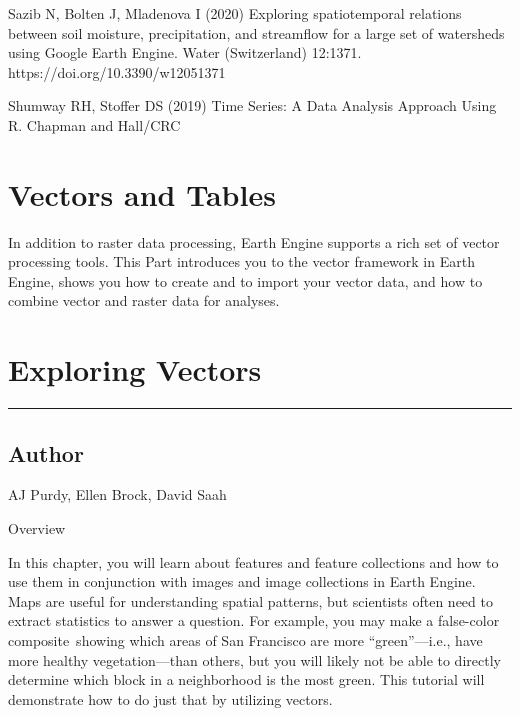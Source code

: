 \documentclass[
  letterpaper,
  DIV=11,
  numbers=noendperiod]{scrreprt}
\begin{document}
Sazib N, Bolten J, Mladenova I (2020) Exploring spatiotemporal relations
between soil moisture, precipitation, and streamflow for a large set of
watersheds using Google Earth Engine. Water (Switzerland) 12:1371.
https://doi.org/10.3390/w12051371

Shumway RH, Stoffer DS (2019) Time Series: A Data Analysis Approach
Using R. Chapman and Hall/CRC

\hypertarget{vectors-and-tables}{%
\chapter{Vectors and Tables}\label{vectors-and-tables}}

In addition to raster data processing, Earth Engine supports a rich set
of vector processing tools. This Part introduces you to the vector
framework in Earth Engine, shows you how to create and to import your
vector data, and how to combine vector and raster data for analyses.

\hypertarget{exploring-vectors}{%
\chapter{Exploring Vectors}\label{exploring-vectors}}

\begin{center}\rule{0.5\linewidth}{0.5pt}\end{center}

\hypertarget{author-15}{%
\section*{Author}\label{author-15}}


AJ Purdy, Ellen Brock, David Saah

Overview

In this chapter, you will learn about features and feature collections
and how to use them in conjunction with images and image collections in
Earth Engine. Maps are useful for understanding spatial patterns, but
scientists often need to extract statistics to answer a question. For
example, you may make a false-color composite~showing which areas of San
Francisco are more ``green''---i.e., have more healthy vegetation---than
others, but you will likely not be able to directly determine which
block in a neighborhood is the most green. This tutorial will
demonstrate how to do just that by utilizing vectors.
\end{document}
